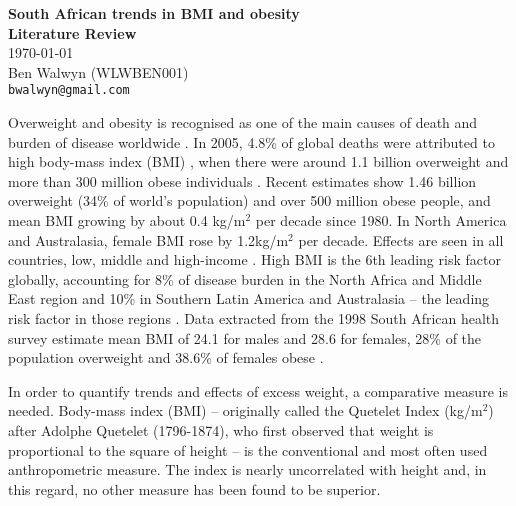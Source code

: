 \documentclass[12pt,a4paper]{article}
\begin{document}
\begin{titlepage}

\begin{center}
{\Huge \bf South African trends in BMI and obesity\\
\bigskip
\Large Literature Review}\\

\today\\
Ben Walwyn (WLWBEN001)\\
{\tt bwalwyn@gmail.com}

\end{center}

\end{titlepage}


Overweight and obesity is recognised as one of the main causes of death and burden of disease worldwide \citep{ezzati02}. In 2005, 4.8\% of global deaths were attributed to high body-mass index (BMI) \citep{whobook}, when there were around 1.1 billion overweight and more than 300 million obese individuals \citep{haslam05}. Recent estimates \citep{stevens11} show 1.46 billion overweight (34\% of world's population) and over 500 million obese people, and mean BMI growing by about 0.4 kg/m$^2$ per decade since 1980. In North America and Australasia, female BMI rose by 1.2kg/m$^2$ per decade. Effects are seen in all countries, low, middle and high-income \citep{whobook}. High BMI is the 6th leading risk factor globally, accounting for 8\% of disease burden in the North Africa and Middle East region and 10\% in Southern Latin America and Australasia -- the leading risk factor in those regions \citep{gbd}. Data extracted from the 1998 South African health survey estimate mean BMI of 24.1 for males and 28.6 for females, 28\% of the population overweight and 38.6\% of females obese \citep{bradshaw}. 

In order to quantify trends and effects of excess weight, a comparative measure is needed. Body-mass index (BMI) -- originally called the Quetelet Index (kg/m$^2$) after Adolphe Quetelet (1796-1874), who first observed that weight is proportional to the square of height \citep{quetelet} -- is the conventional and most often used anthropometric measure. The index is nearly uncorrelated with height \citep{willett99} and, in this regard, no other measure has been found to be superior. 
\end{document}
